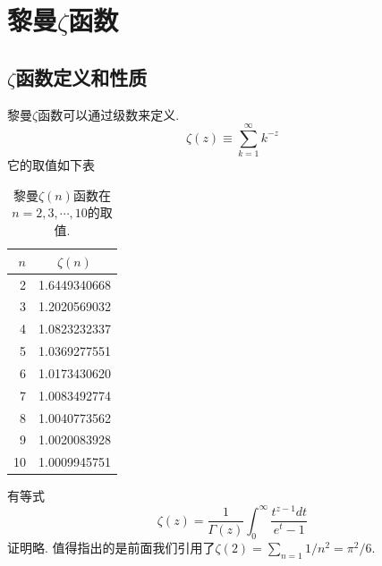\section{黎曼\texorpdfstring{$\zeta$}{zeta}函数}

\subsection{\texorpdfstring{$\zeta$}{zeta}函数定义和性质}
黎曼$\zeta$函数可以通过级数来定义.
\begin{equation}
    \zeta(z) \equiv \sum_{k=1}^{\infty} k^{-z}
\end{equation}
它的取值如下表
\begin{table}
    \centering
\begin{tabular}{rc}
    \hline$n$ & $\zeta(n)$ \\
    \hline 2 & 1.6449340668 \\
    3 & 1.2020569032 \\
    4 & 1.0823232337 \\
    5 & 1.0369277551 \\
    6 & 1.0173430620 \\
    7 & 1.0083492774 \\
    8 & 1.0040773562 \\
    9 & 1.0020083928 \\
    10 & 1.0009945751 \\
    \hline
\end{tabular}
\caption{黎曼$\zeta(n)$函数在$n=2,3,\cdots, 10$的取值.}
\end{table}

有等式
$$
\zeta(z)=\frac{1}{\Gamma(z)} \int_0^{\infty} \frac{t^{z-1} d t}{e^t-1}
$$
证明略.
值得指出的是前面我们引用了$\zeta(2) = \sum_{n=1} 1/n^2 = \pi^2/6$.

